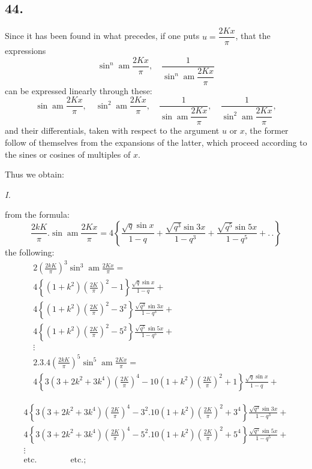 \documentclass{article}
\begin{document}
\subsection*{44.}

Since it has been found in what precedes, if one puts $u=\dfrac{2Kx}{\pi}$, that the expressions
\[
\sin^{n}\operatorname{am}\frac{2Kx}{\pi},\quad\frac{1}{\sin^{n}\operatorname{am}\dfrac{2Kx}{\pi}}
\]
can be expressed linearly through these:
\[
\sin\operatorname{am}\frac{2Kx}{\pi},\quad\sin^{2}\operatorname{am}\frac{2Kx}{\pi},\quad\frac{1}{\sin\operatorname{am}\dfrac{2Kx}{\pi}},\quad\frac{1}{\sin^{2}\operatorname{am}\dfrac{2Kx}{\pi}},
\]
and their differentials, taken with respect to the argument $u$ or $x$, the former follow of themselves from the expansions of the latter, which proceed according to the sines or cosines of multiples of $x$.

Thus we obtain:

\emph{I.}

from the formula:
\[
\frac{2kK}{\pi}.\sin\operatorname{am}\frac{2Kx}{\pi}=4\left\{\frac{\sqrt{q}\sin x}{1-q}+\frac{\sqrt{q^{3}}\sin 3x}{1-q^{3}}+\frac{\sqrt{q^{5}}\sin 5x}{1-q^{5}}+.\,.\right\}
\]
the following:
\[
\begin{gathered}
2\left(\frac{2kK}{\pi}\right)^{3}\sin^{3}\operatorname{am}\frac{2Kx}{\pi}=\\[1.5ex]
4\left\{(1+k^{2})\left(\frac{2K}{\pi}\right)^{2}-1\right\}\frac{\sqrt{q}\sin x}{1-q}+\\[1.5ex]
4\left\{(1+k^{2})\left(\frac{2K}{\pi}\right)^{2}-3^{2}\right\}\frac{\sqrt{q^{3}}\sin 3x}{1-q^{3}}+\\[1.5ex]
4\left\{(1+k^{2})\left(\frac{2K}{\pi}\right)^{2}-5^{2}\right\}\frac{\sqrt{q^{5}}\sin 5x}{1-q^{5}}+\\[1.5ex]
\vdots\\[1.5ex]
2.3.4\left(\frac{2kK}{\pi}\right)^{5}\sin^{5}\operatorname{am}\frac{2Kx}{\pi}=\\[1.5ex]
4\left\{3(3+2k^{2}+3k^{4})\left(\frac{2K}{\pi}\right)^{4}-10(1+k^{2})\left(\frac{2K}{\pi}\right)^{2}+1\right\}\frac{\sqrt{q}\sin x}{1-q}+
\end{gathered}
\]

\[
\begin{gathered}
4\left\{3(3+2k^{2}+3k^{4})\left(\frac{2K}{\pi}\right)^{4}-3^{2}.10(1+k^{2})\left(\frac{2K}{\pi}\right)^{2}+3^{4}\right\}\frac{\sqrt{q^{3}}\sin 3x}{1-q^{3}}+\\[1.5ex]
4\left\{3(3+2k^{2}+3k^{4})\left(\frac{2K}{\pi}\right)^{4}-5^{2}.10(1+k^{2})\left(\frac{2K}{\pi}\right)^{2}+5^{4}\right\}\frac{\sqrt{q^{5}}\sin 5x}{1-q^{5}}+\\[1.5ex]
\vdots\\[1.5ex]
\text{etc.}\qquad\qquad\text{etc.};
\end{gathered}
\]
\end{document}

